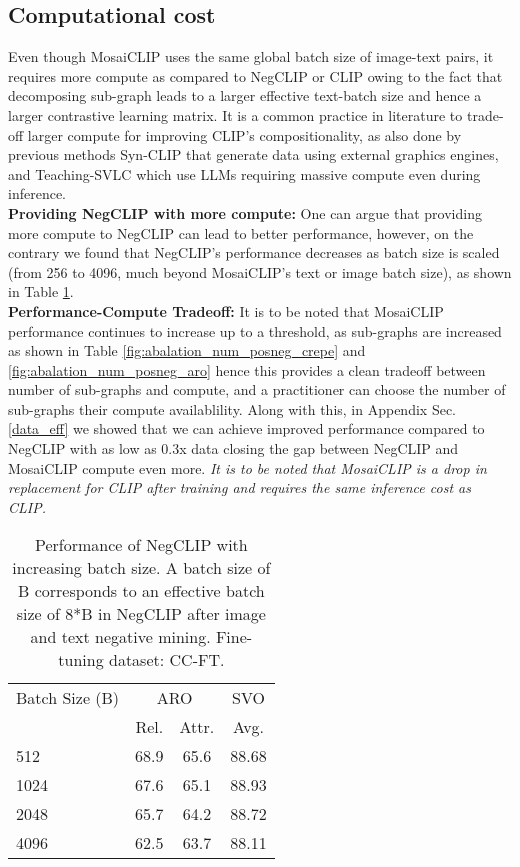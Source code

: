 \documentclass[11pt]{article}
\newcommand{\methodcomp}{MosaiCLIP}
\newcommand{\clip}{CLIP}
\newcommand{\negclip}{NegCLIP}
\begin{document}
\subsection{Computational cost}
\label{computational_cost}
Even though \methodcomp{} uses the same global batch size of image-text pairs, it requires more compute as compared to \negclip{} or \clip{} owing to the fact that decomposing sub-graph leads to a larger effective text-batch size and hence a larger contrastive learning matrix. It is a common practice in literature to trade-off larger compute for improving \clip{}'s compositionality, as also done by previous methods Syn-CLIP \citep{cascantebonilla2023going} that generate data using external graphics engines, and Teaching-SVLC \citep{doveh2023teaching} which use LLMs requiring massive compute even during inference. \\
\textbf{Providing \negclip{} with more compute:} One can argue that providing more compute to \negclip{} can lead to better performance, however, on the contrary we found that \negclip{}'s performance decreases as batch size is scaled (from 256 to 4096, much beyond \methodcomp{}'s text or image batch size), as shown in Table \ref{scale_negclip_batch_size}. \\
\textbf{Performance-Compute Tradeoff:} It is to be noted that \methodcomp{} performance continues to increase up to a threshold, as sub-graphs are increased as shown in Table \ref{fig:abalation_num_posneg_crepe} and \ref{fig:abalation_num_posneg_aro} hence this provides a clean tradeoff between number of sub-graphs and compute, and a practitioner can choose the number of sub-graphs their compute availablility. Along with this, in Appendix Sec. \ref{data_eff} we showed that we can achieve improved performance compared to \negclip{} with as low as 0.3x data closing the gap between \negclip{} and \methodcomp{} compute even more. \textit{It is to be noted that \methodcomp{} is a drop in replacement for \clip{} after training and requires the same inference cost as \clip{}.}

\begin{table}[h!]
\small
\centering
    \begin{tabular}{lccc}
    \toprule
    Batch Size (B) & \multicolumn{2}{c|}{ARO} & \multicolumn{1}{c}{SVO} \\
    \cmidrule(lr){2-3} \cmidrule(lr){4-4}
    & Rel. & Attr. & Avg. \\
    \midrule
    512 & 68.9 & 65.6 & 88.68 \\
    1024 & 67.6 & 65.1 & 88.93 \\
    2048 & 65.7 & 64.2 & 88.72 \\
    4096 & 62.5 & 63.7 & 88.11 \\
    \bottomrule
    \end{tabular}

    \caption{Performance of \negclip{} with increasing batch size. A batch size of B corresponds to an effective batch size of 8*B in \negclip{} after image and text negative mining. Fine-tuning dataset: CC-FT.}
    \label{scale_negclip_batch_size}
\end{table}
\end{document}
